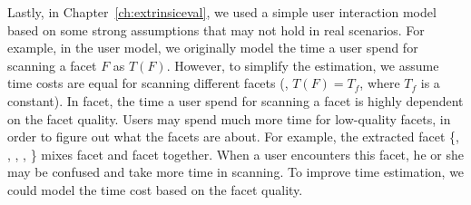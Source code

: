 Lastly, in Chapter~\ref{ch:extrinsiceval}, we used a simple user interaction model based on some strong assumptions that may not hold in real scenarios. For example, in the user model, we originally model the time a user spend for scanning a facet $F$ as $T(F)$. However, to simplify the estimation, we assume time costs are equal for scanning different facets (\ie, $T(F)=T_f$, where $T_f$ is a constant). In facet, the time a user spend for scanning a facet is highly dependent on the facet quality. Users may spend much more time for low-quality facets, in order to figure out what the facets are about. For example, the extracted facet \{, , , , \} mixes facet  and facet  together. When a user encounters this facet, he or she may be confused and take more time in scanning.
To improve time estimation, we could model the time cost based on the facet quality.








